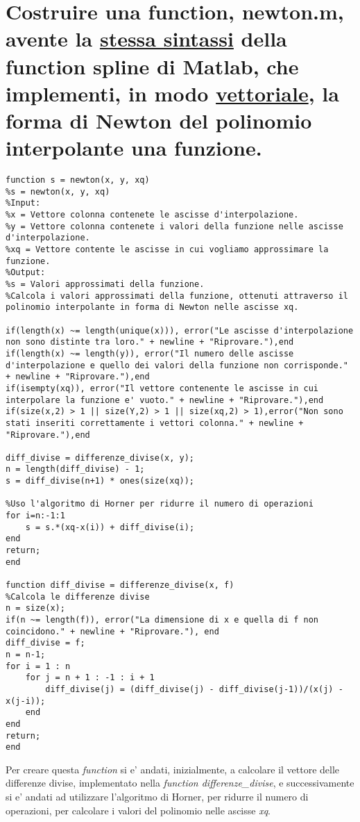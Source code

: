 \documentclass[10pt,a4paper]{article}
\begin{document}
\section{
  Costruire una function, \textbf{newton.m}, avente la \underline{stessa sintassi} della function \textbf{spline}
  di Matlab, che implementi, in modo \underline{vettoriale}, la forma di Newton del polinomio interpolante una
  funzione.
 }
 \begin{lstlisting}[style=Matlab-editor]
function s = newton(x, y, xq)
%s = newton(x, y, xq)
%Input:
%x = Vettore colonna contenete le ascisse d'interpolazione.
%y = Vettore colonna contenete i valori della funzione nelle ascisse d'interpolazione.
%xq = Vettore contente le ascisse in cui vogliamo approssimare la funzione.
%Output:
%s = Valori approssimati della funzione.
%Calcola i valori approssimati della funzione, ottenuti attraverso il polinomio interpolante in forma di Newton nelle ascisse xq.

if(length(x) ~= length(unique(x))), error("Le ascisse d'interpolazione non sono distinte tra loro." + newline + "Riprovare."),end 
if(length(x) ~= length(y)), error("Il numero delle ascisse d'interpolazione e quello dei valori della funzione non corrisponde." + newline + "Riprovare."),end
if(isempty(xq)), error("Il vettore contenente le ascisse in cui interpolare la funzione e' vuoto." + newline + "Riprovare."),end
if(size(x,2) > 1 || size(Y,2) > 1 || size(xq,2) > 1),error("Non sono stati inseriti correttamente i vettori colonna." + newline + "Riprovare."),end

diff_divise = differenze_divise(x, y);
n = length(diff_divise) - 1;
s = diff_divise(n+1) * ones(size(xq));

%Uso l'algoritmo di Horner per ridurre il numero di operazioni
for i=n:-1:1
    s = s.*(xq-x(i)) + diff_divise(i);  
end
return;
end

function diff_divise = differenze_divise(x, f)
%Calcola le differenze divise
n = size(x);
if(n ~= length(f)), error("La dimensione di x e quella di f non coincidono." + newline + "Riprovare."), end
diff_divise = f;
n = n-1;
for i = 1 : n
    for j = n + 1 : -1 : i + 1
        diff_divise(j) = (diff_divise(j) - diff_divise(j-1))/(x(j) - x(j-i));
    end
end
return;
end
\end{lstlisting}

Per creare questa \textit{function} si e' andati, inizialmente, a calcolare il
vettore delle differenze divise, implementato nella \textit{function differenze\_divise}, e
successivamente si e' andati ad utilizzare l'algoritmo di Horner, per ridurre
il numero di operazioni, per calcolare i valori del polinomio nelle ascisse \textit{xq}.
\end{document}
